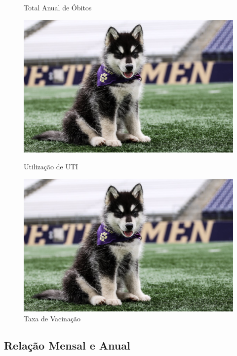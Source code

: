 \documentclass{article}
\begin{document}
\begin{figure}[H]
\begin{minipage}{0.45\textwidth}
        \caption{Total Anual de Óbitos}
        \label{fig:obitos-total-por-ano}
    \end{minipage}
    \hfill
    \begin{minipage}{0.45\textwidth}
        \centering
        \includegraphics[width=\textwidth]{dubs.jpg}
        \caption{Utilização de UTI}
        \label{fig:uti-total-por-ano}
    \end{minipage}
    \hfill
    \begin{minipage}{0.45\textwidth}
        \centering
        \includegraphics[width=\textwidth]{dubs.jpg}
        \caption{Taxa de Vacinação}
        \label{fig:vacinacao-total-por-ano}
    \end{minipage}
\end{figure}


\subsection{Relação Mensal e Anual}
\end{document}
